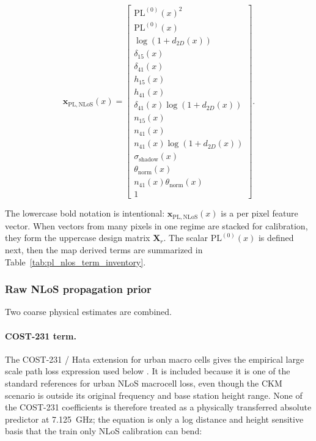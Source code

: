 \begin{equation}
\textbf{x}_{\mathrm{PL,NLoS}}(x)
=
\begin{bmatrix}
\mathrm{PL}^{(0)}(x)^2 \\
\mathrm{PL}^{(0)}(x) \\
\log(1+d_{2D}(x)) \\
\delta_{15}(x) \\
\delta_{41}(x) \\
h_{15}(x) \\
h_{41}(x) \\
\delta_{41}(x)\log(1+d_{2D}(x)) \\
n_{15}(x) \\
n_{41}(x) \\
n_{41}(x)\log(1+d_{2D}(x)) \\
\sigma_{\mathrm{shadow}}(x) \\
\theta_{\mathrm{norm}}(x) \\
n_{41}(x)\theta_{\mathrm{norm}}(x) \\
1
\end{bmatrix}.
\label{eq:x_pl_nlos}
\end{equation}

The lowercase bold notation is intentional:
\(\textbf{x}_{\mathrm{PL,NLoS}}(x)\) is a per pixel feature vector. When
vectors from many pixels in one regime are stacked for calibration, they form
the uppercase design matrix \(\textbf{X}_r\). The scalar
\(\mathrm{PL}^{(0)}(x)\) is defined next, then the map derived terms are
summarized in Table~\ref{tab:pl_nlos_term_inventory}.

\subsubsection{Raw NLoS propagation prior}

Two coarse physical estimates are combined.

\paragraph{COST-231 term.}
The COST-231 / Hata extension for urban macro cells gives the empirical
large scale path loss expression used below \cite{cost231}. It is included
because it is one of the standard references for urban NLoS macrocell loss,
even though the CKM scenario is outside its original frequency and base station
height range. None of the COST-231 coefficients is therefore treated as a
physically transferred absolute predictor at \SI{7.125}{GHz}; the equation is
only a log distance and height sensitive basis that the train only NLoS
calibration can bend:

